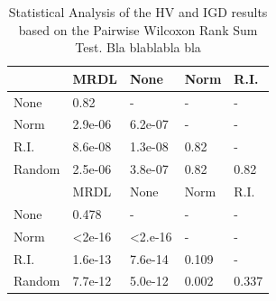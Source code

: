 \begin{table}[]
\begin{tabular}{lllll}
\hline
\rowcolor[gray]{.7} \multicolumn{1}{|l|}{HV}  & \multicolumn{1}{|l|}{MRDL} & \multicolumn{1}{l|}{None} & \multicolumn{1}{l|}{Norm} & \multicolumn{1}{l|}{R.I.} \\ \hline \hline \hline
None                      & 0.82                      & -                         & -                         & -                         \\
\rowcolor[gray]{.95}Norm                      & 2.9e-06                   & 6.2e-07                   & -                         & -                         \\
R.I.                      & 8.6e-08                   & 1.3e-08                   & 0.82                      & -                         \\
\rowcolor[gray]{.95}Random                    & 2.5e-06                   & 3.8e-07                   & 0.82                      & 0.82                      \\ \hline \hline \hline
\rowcolor[gray]{.7} \multicolumn{1}{|l|}{IGD} & \multicolumn{1}{|l|}{MRDL} & \multicolumn{1}{l}{None} & \multicolumn{1}{l}{Norm} & \multicolumn{1}{l|}{R.I.} \\ \hline \hline \hline
None                      & 0.478                     & -                         & -                         & -                         \\
\rowcolor[gray]{.95}Norm                      & \textless 2e-16           & \textless 2.e-16          & -                         & -                         \\
R.I.                      & 1.6e-13                   & 7.6e-14                   & 0.109                     & -                         \\
\rowcolor[gray]{.95}Random                    & 7.7e-12                   & 5.0e-12                   & 0.002                     & 0.337
\end{tabular}
\caption{Statistical Analysis of the HV and IGD results based on the Pairwise Wilcoxon Rank Sum Test. Bla blablabla bla}
\label{statistics}
\end{table}


